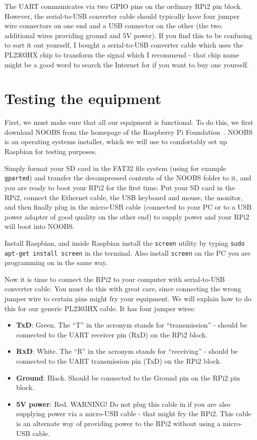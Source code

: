 \documentclass[a4paper,11pt,reqno]{amsart}
\begin{document}
The UART communicates via two GPIO pins on the ordinary RPi2 pin block. However, the serial-to-USB converter cable should typically have four jumper wire connectors on one end and a USB connector on the other (the two additional wires providing ground and 5V power). If you find this to be confusing to sort it out yourself, I bought a serial-to-USB converter cable which uses the PL2303HX chip to transform the signal which I recommend - that chip name might be a good word to search the Internet for if you want to buy one yourself.

\section{Testing the equipment}
First, we must make sure that all our equipment is functional. To do this, we first download NOOBS from the homepage of the Raspberry Pi Foundation~\cite{noobs}. NOOBS is an operating systems installer, which we will use to comfortably set up Raspbian for testing purposes.

Simply format your SD card in the FAT32 file system (using for example \texttt{gparted}) and transfer the decompressed contents of the NOOBS folder to it, and you are ready to boot your RPi2 for the first time. Put your SD card in the RPi2, connect the Ethernet cable, the USB keyboard and mouse, the monitor, and then finally plug in the micro-USB cable (connected to your PC or to a USB power adapter of good quality on the other end) to supply power and your RPi2 will boot into NOOBS.

Install Raspbian, and inside Raspbian install the \texttt{screen} utility by typing \texttt{sudo apt-get install screen} in the terminal. Also install \texttt{screen} on the PC you are programming on in the same way.

Now it is time to connect the RPi2 to your computer with serial-to-USB converter cable. You must do this with great care, since connecting the wrong jumper wire to certain pins might fry your equipment. We will explain how to do this for our generic PL2303HX cable. It has four jumper wires:

\begin{itemize}
  \item \textbf{TxD}: Green. The ``T'' in the acronym stands for ``transmission'' - should be connected to the UART receiver pin (RxD) on the RPi2 block.
  \item \textbf{RxD}: White. The ``R'' in the acronym stands for ``receiving'' - should be connected to the UART transmission pin (TxD) on the RPi2 block.
  \item \textbf{Ground}: Black. Should be connected to the Ground pin on the RPi2 pin block.
  \item \textbf{5V power}: Red. WARNING! Do not plug this cable in if you are also supplying power via a micro-USB cable - that might fry the RPi2. This cable is an alternate way of providing power to the RPi2 without using a micro-USB cable.
\end{itemize}
\end{document}
